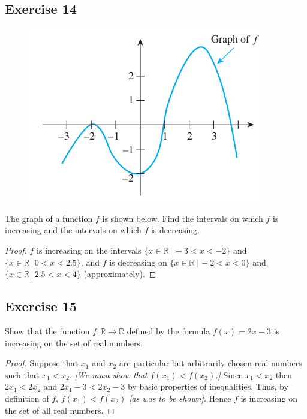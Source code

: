\documentclass[14pt]{extarticle}
\newcommand{\R}{\mathbb{R}}
\begin{document}
\subsection{Exercise 14}
\begin{figure}[ht!]
    \centering
    \includegraphics[scale=0.5]{../images/11.1.14.png}
\end{figure}

The graph of a function \(f\) is shown below. Find the intervals on which \(f\) is increasing and the intervals on
which \(f\) is decreasing.

\begin{proof}
    \(f\) is increasing on the intervals \(\{x \in \R \,|\, -3 < x < -2\}\) and \(\{x \in \R \,|\, 0 < x < 2.5\}\), and \(f\) is
    decreasing on \(\{x \in \R \,|\, -2 < x < 0\}\) and \(\{x \in \R \,|\, 2.5 < x < 4\}\) (approximately).
\end{proof}

\subsection{Exercise 15}
Show that the function \(f: \R \to \R\) defined by the formula \(f(x) = 2x - 3\) is increasing on the set of real numbers.

\begin{proof}
    Suppose that \(x_1\) and \(x_2\) are particular but arbitrarily chosen real numbers such that \(x_1 < x_2\).
        {\it [We must show that \(f(x_1) < f(x_2)\).]} Since \(x_1 < x_2\) then \(2x_1 < 2x_2\) and \(2x_1 - 3 < 2x_2 - 3\) by
    basic properties of inequalities. Thus, by definition of \(f\), \(f(x_1) < f(x_2)\) {\it [as was to be shown]}.
    Hence \(f\) is increasing on the set of all real numbers.
\end{proof}
\end{document}
